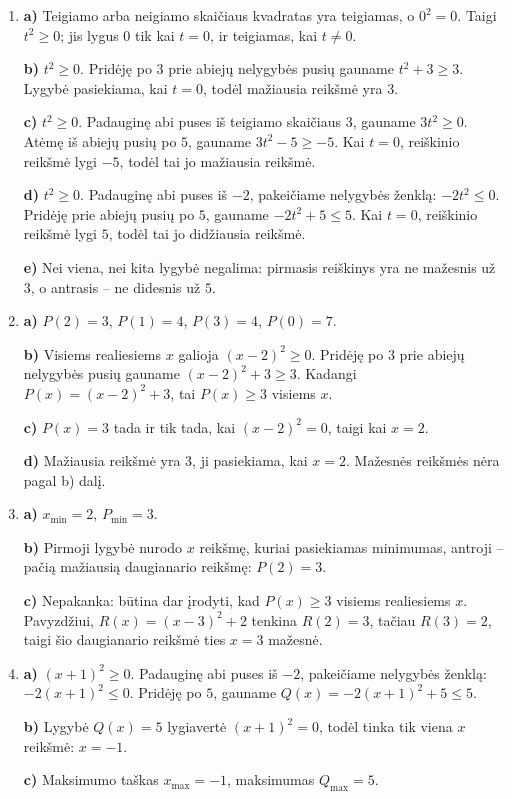 \documentclass[12pt,a4paper]{article}
\begin{document}
\begin{enumerate}
\item \textbf{a)} Teigiamo arba neigiamo skaičiaus kvadratas yra teigiamas, o $0^2=0$. Taigi $t^2\ge0$; jis lygus $0$ tik kai $t=0$, ir teigiamas, kai $t\ne0$.

\textbf{b)} $t^2\ge0$. Pridėję po $3$ prie abiejų nelygybės pusių gauname $t^2+3\ge3$. Lygybė pasiekiama, kai $t=0$, todėl mažiausia reikšmė yra $3$.

\textbf{c)} $t^2\ge0$. Padauginę abi puses iš teigiamo skaičiaus $3$, gauname $3t^2\ge0$. Atėmę iš abiejų pusių po $5$, gauname $3t^2-5\ge-5$. Kai $t=0$, reiškinio reikšmė lygi $-5$, todėl tai jo mažiausia reikšmė.

\textbf{d)} $t^2\ge0$. Padauginę abi puses iš $-2$, pakeičiame nelygybės ženklą: $-2t^2\le0$. Pridėję prie abiejų pusių po $5$, gauname $-2t^2+5\le5$. Kai $t=0$, reiškinio reikšmė lygi $5$, todėl tai jo didžiausia reikšmė.

\textbf{e)} Nei viena, nei kita lygybė negalima: pirmasis reiškinys yra ne mažesnis už $3$, o antrasis – ne didesnis už $5$.
\item \textbf{a)} $P(2)=3$, $P(1)=4$, $P(3)=4$, $P(0)=7$.

\textbf{b)} Visiems realiesiems $x$ galioja $(x-2)^2\ge0$. Pridėję po $3$ prie abiejų nelygybės pusių gauname $(x-2)^2+3\ge3$. Kadangi $P(x)=(x-2)^2+3$, tai $P(x)\ge3$ visiems $x$.

\textbf{c)} $P(x)=3$ tada ir tik tada, kai $(x-2)^2=0$, taigi kai $x=2$.

\textbf{d)} Mažiausia reikšmė yra $3$, ji pasiekiama, kai $x=2$. Mažesnės reikšmės nėra pagal b) dalį.
\item \textbf{a)} $x_{\min}=2$, $P_{\min}=3$.

\textbf{b)} Pirmoji lygybė nurodo $x$ reikšmę, kuriai pasiekiamas minimumas, antroji – pačią mažiausią daugianario reikšmę: $P(2)=3$.

\textbf{c)} Nepakanka: būtina dar įrodyti, kad $P(x)\ge3$ visiems realiesiems $x$. Pavyzdžiui, $R(x)=(x-3)^2+2$ tenkina $R(2)=3$, tačiau $R(3)=2$, taigi šio daugianario reikšmė ties $x=3$ mažesnė.
\item \textbf{a)} $(x+1)^2\ge0$. Padauginę abi puses iš $-2$, pakeičiame nelygybės ženklą: $-2(x+1)^2\le0$. Pridėję po $5$, gauname $Q(x)=-2(x+1)^2+5\le5$.

\textbf{b)} Lygybė $Q(x)=5$ lygiavertė $(x+1)^2=0$, todėl tinka tik viena $x$ reikšmė: $x=-1$.

\textbf{c)} Maksimumo taškas $x_{\max}=-1$, maksimumas $Q_{\max}=5$.


\end{enumerate}
\end{document}
